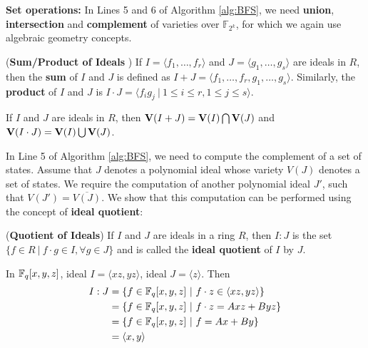 {\bf Set operations:} In Lines 5 and 6 of
Algorithm  \ref{alg:BFS}, we need  \textbf{union}, 
\textbf{intersection} and \textbf{complement} of varieties over
$\mathbb{F}_{2^k}$, for which we again use algebraic geometry concepts.

\begin{Definition}
\label{def:sum}
({\bf Sum/Product of Ideals} \cite{ideals:book}) If $I = \langle f_1,
\dots, f_r\rangle$ and $J = \langle g_1, \dots, g_s\rangle$ are
ideals in $R$, then the {\bf sum} of $I$ and $J$ is defined as $I + J
= \langle f_1, \dots, f_r, g_1, \dots, g_s\rangle$. Similarly, the
{\bf product} of $I$ and $J$ is $I \cdot J = \langle
f_ig_j\ |\ 1 \leq i \leq r, 1 \leq j \leq s\rangle$. 
\end{Definition}

\begin{Theorem}
\label{thm:unionintersect}
If $I$ and $J$ are ideals in $R$, then 
${\bf V}(I + J) = {\bf V}(I) \bigcap {\bf V}(J)$ and ${\bf V}(I \cdot
J) = {\bf V}(I) \bigcup {\bf V}(J)$. 
\end{Theorem}


In Line 5 of Algorithm  \ref{alg:BFS}, we need to compute the complement of a
set of states. Assume that $J$ denotes a polynomial ideal whose
variety $V(J)$ denotes a set of states. We require the computation of
another polynomial ideal $J'$, such that $V(J')=\overline{V(J)}$. We
show that this computation can be performed using the concept of {\bf
  ideal quotient}:  

\begin{Definition}
\label{def:quo}
({\bf Quotient of Ideals}) If $I$ and $J$ are ideals in a ring $R$, then $I:J$ is the set
  $\{f \in R \ |\ f\cdot g \in I, \forall g \in J\}$ %
and is called the {\bf ideal quotient} of $I$ by $J$.
\end{Definition}

\begin{Example}
In ${\mathbb{F}}_{q}[x,y,z]$, ideal $I = \langle xz,yz\rangle$, ideal $J = \langle z\rangle$. Then
\begin{align*}
I:J &= \{f\in{\mathbb{F}}_{q}[x,y,z]~|~f\cdot z \in \langle xz,yz\rangle\} \\
&= \{f\in{\mathbb{F}}_{q}[x,y,z]~|~f\cdot z = Axz+Byz\}\\
&= \{f\in{\mathbb{F}}_{q}[x,y,z]~|~f= Ax+By\}\\
&= \langle x,y\rangle
\end{align*}
\end{Example}

